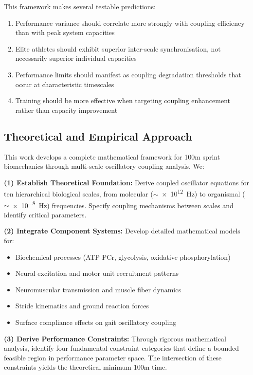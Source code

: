 \documentclass[10pt]{article}
\begin{document}
This framework makes several testable predictions:

\begin{enumerate}
\item Performance variance should correlate more strongly with coupling efficiency than with peak system capacities
\item Elite athletes should exhibit superior inter-scale synchronisation, not necessarily superior individual capacities
\item Performance limits should manifest as coupling degradation thresholds that occur at characteristic timescales
\item Training should be more effective when targeting coupling enhancement rather than capacity improvement
\end{enumerate}

\subsection{Theoretical and Empirical Approach}

This work develops a complete mathematical framework for 100m sprint biomechanics through multi-scale oscillatory coupling analysis. We:

\textbf{(1) Establish Theoretical Foundation:} Derive coupled oscillator equations for ten hierarchical biological scales, from molecular ($\sim$\SI{e12}{\hertz}) to organismal ($\sim$\SI{e-8}{\hertz}) frequencies. Specify coupling mechanisms between scales and identify critical parameters.

\textbf{(2) Integrate Component Systems:} Develop detailed mathematical models for:
\begin{itemize}
\item Biochemical processes (ATP-PCr, glycolysis, oxidative phosphorylation)
\item Neural excitation and motor unit recruitment patterns
\item Neuromuscular transmission and muscle fiber dynamics
\item Stride kinematics and ground reaction forces
\item Surface compliance effects on gait oscillatory coupling
\end{itemize}

\textbf{(3) Derive Performance Constraints:} Through rigorous mathematical analysis, identify four fundamental constraint categories that define a bounded feasible region in performance parameter space. The intersection of these constraints yields the theoretical minimum 100m time.
\end{document}
